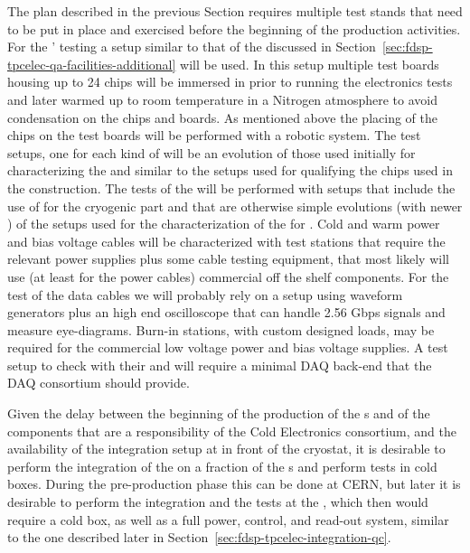 The  plan described in the previous Section requires
multiple test stands that need to be put in place and exercised 
before the beginning of the production activities. For the '
testing a setup similar to that of the  discussed in
Section~\ref{sec:fdsp-tpcelec-qa-facilities-additional} will
be used. In this setup multiple test boards housing up to 24
chips will be immersed in \lntwo prior to running the
electronics tests and later warmed up to room temperature in 
a Nitrogen atmosphere to avoid condensation on the chips and
boards. As mentioned above the placing of the chips on the test 
boards will be performed with a robotic system. The test setups,
one for each kind of  will be an evolution of those
used initially for characterizing the  and similar
to the setups used for qualifying the chips used in the 
construction. The tests of the  will be performed with
setups that include the use of  for the cryogenic part
and that are otherwise simple evolutions (with newer )
of the setups used for the characterization of the 
for . Cold and warm power and bias voltage cables will
be characterized with test stations that require the relevant 
power supplies plus some cable testing equipment, that most likely will
use (at least for the power cables) commercial off the shelf components.
For the test of the data cables we will probably rely on a setup
using waveform generators plus an high end oscilloscope that 
can handle 2.56 Gbps signals and measure eye-diagrams. 
Burn-in stations, with custom designed loads, may be required for 
the commercial low voltage power and bias voltage supplies.
A test setup to check  with their 
and  will require a minimal DAQ back-end that the
DAQ consortium should provide.

Given the delay between the beginning of the production of the
s and of the components that are a responsibility of
the Cold  Electronics consortium, and the availability of the
integration setup at \surf in front of the cryostat, it is
desirable to  perform the integration of the 
on a fraction of the s and perform tests in cold
boxes. During the pre-production phase this can be done at CERN,
but later it is desirable to perform the integration and the
tests at the , which then would require a cold box,
as well as a full power, control, and read-out system, similar
to the one described later in Section~\ref{sec:fdsp-tpcelec-integration-qc}.
